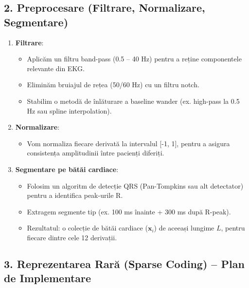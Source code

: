 \documentclass[12pt]{article}
\begin{document}
\subsection*{2. Preprocesare (Filtrare, Normalizare, Segmentare)}
\begin{enumerate}[label=(\alph*)]
    \item \textbf{Filtrare}:
    \begin{itemize}
        \item Aplicăm un filtru band-pass (0.5 -- 40 Hz) pentru a reține componentele relevante din EKG.
        \item Eliminăm bruiajul de rețea (50/60 Hz) cu un filtru notch.
        \item Stabilim o metodă de înlăturare a baseline wander (ex. high-pass la 0.5 Hz sau spline interpolation).
    \end{itemize}

    \item \textbf{Normalizare}:
    \begin{itemize}
        \item Vom normaliza fiecare derivată la intervalul [-1, 1], pentru a asigura consistența amplitudinii între pacienți diferiți.
    \end{itemize}

    \item \textbf{Segmentare pe bătăi cardiace}:
    \begin{itemize}
        \item Folosim un algoritm de detecție QRS (Pan-Tompkins sau alt detectator) pentru a identifica peak-urile R.
        \item Extragem segmente tip (ex. 100 ms înainte + 300 ms după R-peak).
        \item Rezultatul: o colecție de bătăi cardiace ($\mathbf{x}_i$) de aceeași lungime $L$, pentru fiecare dintre cele 12 derivații.
    \end{itemize}
\end{enumerate}

\subsection*{3. Reprezentarea Rară (Sparse Coding) -- Plan de Implementare}
\end{document}
